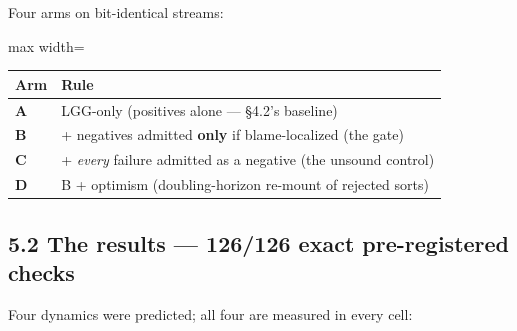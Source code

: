 \documentclass[11pt]{article}
\begin{document}
Four arms on bit-identical streams:

\begin{center}\small\begin{adjustbox}{max width=\linewidth}\begin{tabular}{ll}\toprule
Arm & Rule \\ \midrule
\textbf{A} & LGG-only (positives alone — §4.2's baseline) \\
\textbf{B} & + negatives admitted \textbf{only} if blame-localized (the gate) \\
\textbf{C} & + \emph{every} failure admitted as a negative (the unsound control) \\
\textbf{D} & B + optimism (doubling-horizon re-mount of rejected sorts) \\
\bottomrule\end{tabular}\end{adjustbox}\end{center}

\subsection*{5.2 The results — 126/126 exact pre-registered checks}

Four dynamics were predicted; all four are measured in every cell:
\end{document}
